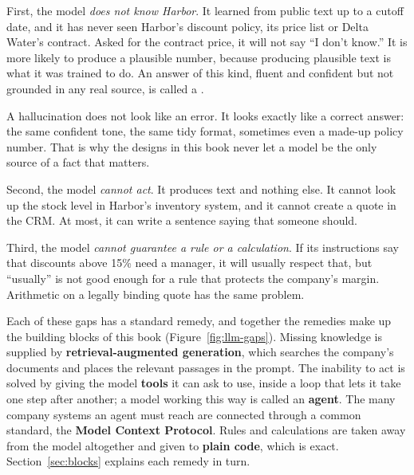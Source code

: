 First, the model \emph{does not know Harbor}. It learned from public text up to a cutoff date, and it has never seen Harbor's discount policy, its price list or Delta Water's contract. Asked for the contract price, it will not say ``I don't know.'' It is more likely to produce a plausible number, because producing plausible text is what it was trained to do. An answer of this kind, fluent and confident but not grounded in any real source, is called a .

\begin{watchout}
A hallucination does not look like an error. It looks exactly like a correct answer: the same confident tone, the same tidy format, sometimes even a made-up policy number. That is why the designs in this book never let a model be the only source of a fact that matters.
\end{watchout}

Second, the model \emph{cannot act}. It produces text and nothing else. It cannot look up the stock level in Harbor's inventory system, and it cannot create a quote in the CRM. At most, it can write a sentence saying that someone should.

Third, the model \emph{cannot guarantee a rule or a calculation}. If its instructions say that discounts above 15\% need a manager, it will usually respect that, but ``usually'' is not good enough for a rule that protects the company's margin. Arithmetic on a legally binding quote has the same problem.

Each of these gaps has a standard remedy, and together the remedies make up the building blocks of this book (Figure~\ref{fig:llm-gaps}). Missing knowledge is supplied by \textbf{retrieval-augmented generation}, which searches the company's documents and places the relevant passages in the prompt. The inability to act is solved by giving the model \textbf{tools} it can ask to use, inside a loop that lets it take one step after another; a model working this way is called an \textbf{agent}. The many company systems an agent must reach are connected through a common standard, the \textbf{Model Context Protocol}. Rules and calculations are taken away from the model altogether and given to \textbf{plain code}, which is exact. Section~\ref{sec:blocks} explains each remedy in turn.

